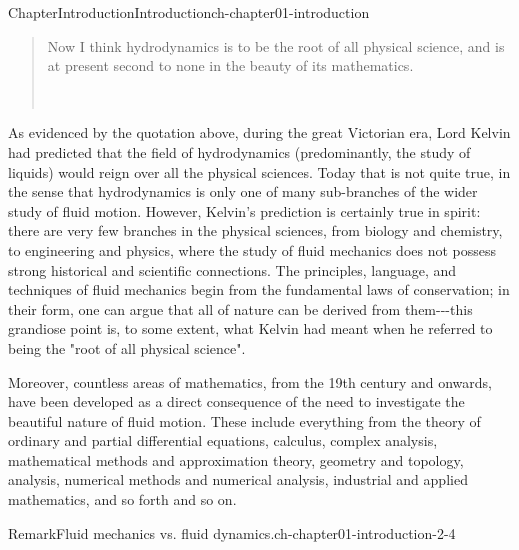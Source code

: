 \documentclass[oneside,10pt,]{book}
\numberwithin{equation}{section}
\begin{document}
\renewcommand*\contentsname{Contents}
\tableofcontents
\mainmatter
%
%
\typeout{************************************************}
\typeout{************************************************}
%
\begin{chapterptx}{Chapter}{Introduction}{}{Introduction}{}{}{ch-chapter01-introduction}
\renewcommand*{\chaptername}{Chapter}
\begin{introduction}{}%
\begin{quote}%
Now I think hydrodynamics is to be the root of all physical science, and is at present second to none in the beauty of its mathematics.%
\nopagebreak\par%
\hfill{}\\\par
\end{quote}
As evidenced by the quotation above, during the great Victorian era, Lord Kelvin had predicted that the field of hydrodynamics (predominantly, the study of liquids) would reign over all the physical sciences. Today that is not quite true, in the sense that hydrodynamics is only one of many sub-branches of the wider study of fluid motion. However, Kelvin's prediction is certainly true in spirit: there are very few branches in the physical sciences, from biology and chemistry, to engineering and physics, where the study of fluid mechanics does not possess strong historical and scientific connections. The principles, language, and techniques of fluid mechanics begin from the fundamental laws of conservation; in their form, one can argue that all of nature can be derived from them-{}-{}-this grandiose point is, to some extent, what Kelvin had meant when he referred to being the "root of all physical science".%
\par
Moreover, countless areas of mathematics, from the 19th century and onwards, have been developed as a direct consequence of the need to investigate the beautiful nature of fluid motion. These include everything from the theory of ordinary and partial differential equations, calculus, complex analysis, mathematical methods and approximation theory, geometry and topology, analysis, numerical methods and numerical analysis, industrial and applied mathematics, and so forth and so on.%
\begin{remark}{Remark}{Fluid mechanics vs. fluid dynamics.}{ch-chapter01-introduction-2-4}%

\end{remark}
\end{introduction}
\end{chapterptx}
\end{document}
